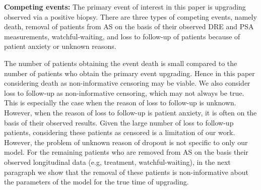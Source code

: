 \textbf{Competing events:} The primary event of interest in this paper is upgrading observed via a positive biopsy. There are three types of competing events, namely death, removal of patients from AS on the basis of their observed DRE and PSA measurements, watchful-waiting, and loss to follow-up of patients because of patient anxiety or unknown reasons.

The number of patients obtaining the event death is small compared to the number of patients who obtain the primary event upgrading. Hence in this paper considering death as non-informative censoring may be viable. We also consider loss to follow-up as non-informative censoring, which may not always be true. This is especially the case when the reason of loss to follow-up is unknown. However, when the reason of loss to follow-up is patient anxiety, it is often on the basis of their observed results.  Given the large number of loss to follow-up patients, considering these patients as censored is a limitation of our work. However, the problem of unknown reason of dropout is not specific to only our model. For the remaining patients who are removed from AS on the basis their observed longitudinal data (e.g, treatment, watchful-waiting), in the next paragraph we show that the removal of these patients is non-informative about the parameters of the model for the true time of upgrading.

